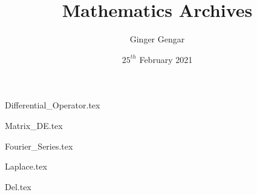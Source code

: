 \documentclass[a4paper, 12pt]{report}
\begin{document}
\title{Mathematics Archives}
\author{Ginger Gengar}
\date{$25^{th}$ February 2021}
\maketitle
\newpage

\tableofcontents

\begin{center}
{Differential_Operator.tex}
\begin{comment}
Start Level: Chapter
End Level: Chapter
Aditional Comments:
\end{comment}
{Matrix_DE.tex}
\begin{comment}
Start Level: Chapter
End Level: Chapter
Aditional Comments:
\end{comment}
{Fourier_Series.tex}
\begin{comment}
Start Level: Chapter
End Level: Chapter
Aditional Comments:
\end{comment}
{Laplace.tex}
\begin{comment}
Start Level: Chapter
End Level: Chapter
Aditional Comments:
\end{comment}
\begin{comment}
Start Level: Chapter
End Level: Chapter
Aditional Comments:
\end{comment}
{Del.tex}
\begin{comment}

\end{comment}
\end{center}
\end{document}
